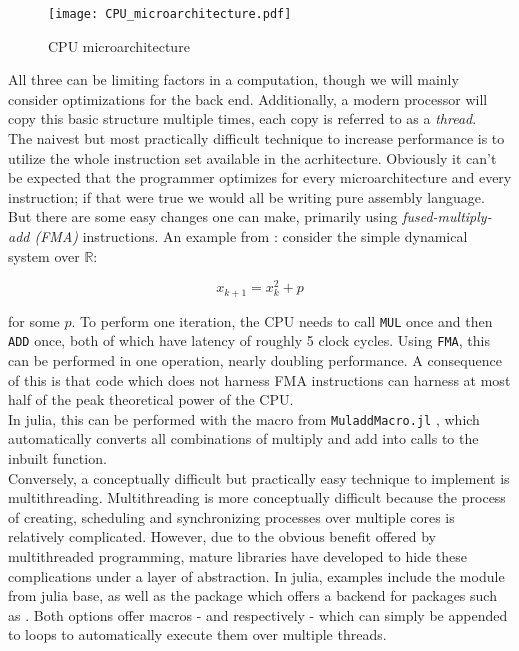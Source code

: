 \begin{figure}[ht]
    \centering
    \texttt{[image: CPU\_microarchitecture.pdf]}
    \caption{\cite*{solvercomp} CPU microarchitecture}
    \label{fig:CPU}
\end{figure}

All three can be limiting factors in a computation, though we will mainly consider 
optimizations for the back end. Additionally, a modern processor will copy this basic 
structure multiple times, each copy is referred to as a \emph{thread}. \\

The naivest but most practically difficult technique to increase performance is to utilize 
the whole instruction set available in the acrhitecture. Obviously it can't be expected 
that the programmer optimizes for every microarchitecture and every instruction; if that were 
true we would all be writing pure assembly language. But there are some easy changes one 
can make, primarily using \emph{fused-multiply-add (FMA)} instructions. An example from 
\cite*{solvercomp}: consider the simple dynamical system over $\mathbb{R}$:

\begin{equation}{}
    x_{k+1} = x_k^2 + p
\end{equation}

for some $p$. To perform one iteration, the CPU needs to call \texttt{MUL} once and then 
\texttt{ADD} once, both of which have latency of roughly 5 clock cycles. Using 
\texttt{FMA}, this can be performed in one operation, nearly doubling performance. A 
consequence of this is that code which does not harness FMA instructions can harness at 
most half of the peak theoretical power of the CPU. \\

In julia, this can be performed with the  macro from \texttt{MuladdMacro.jl} 
\cite*{muladd}, which automatically converts all combinations of multiply and add into 
calls to the inbuilt  function. \\

Conversely, a conceptually difficult but practically easy technique to implement is 
multithreading. Multithreading is more conceptually difficult because the process of 
creating, scheduling and synchronizing processes over multiple cores is relatively 
complicated. However, due to the obvious benefit offered by multithreaded programming, 
mature libraries have developed to hide these complications under a layer of abstraction. 
In julia, examples include the  module from julia base, as well as the 
package  \cite*{transducers} which offers a backend for packages 
such as  \cite*{floops}. Both options offer macros - 
 and  respectively - which can simply be appended to 
 loops to automatically execute them over multiple threads. \\

